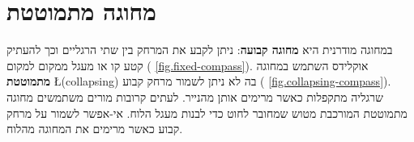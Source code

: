 
\chapter{מחוגה מתמוטטת}\label{c.collapse}


במחוגה מודרנית היא 
\textbf{מחוגה קבועה}:
ניתן לקבע את המרחק בין שתי הרגליים וכך להעתיק קטע קו או מעגל ממקום למקום (%
\ref{fig.fixed-compass}).
אוקלידס השתמש במחוגה 
\textbf{מתמוטטת}
\L{(collapsing)}
בה לא ניתן לשמור מרחק קבוע (%
\ref{fig.collapsing-compass}).
שרגליה מתקפלות כאשר מרימים אותן מהנייר. לעתים קרובות מורים משתמשים מחוגה מתמוטטת המורכבת מטוש שמחובר לחוט כדי לבנות מעגל הלוח. אי-אפשר לשמור על מרחק קבוע כאשר מרימים את המחוגה מהלוח.

